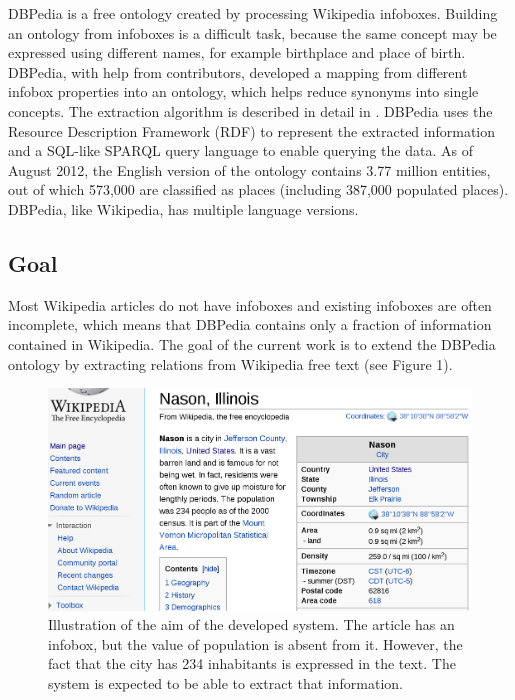 \documentclass[10pt,a5paper,twoside]{article}
\begin{document}
DBPedia is a free ontology created by processing Wikipedia infoboxes. Building an ontology from infoboxes is a difficult task, because the same concept may be expressed using different names, for example birthplace and place of birth. DBPedia, with help from contributors, developed a mapping from different infobox properties into an ontology, which helps reduce synonyms into single concepts. The extraction algorithm is described in detail in \cite{al2007}. DBPedia uses the Resource Description Framework (RDF) to represent the extracted information and a SQL-like SPARQL query language to enable querying the data. As of August 2012, the English version of the ontology contains 3.77 million entities, out of which 573,000 are classified as places (including 387,000 populated places). DBPedia, like Wikipedia, has multiple language versions.

\subsection{Goal}
Most Wikipedia articles do not have infoboxes and existing infoboxes are often incomplete, which means that DBPedia contains only a fraction of information contained in Wikipedia. The goal of the current work is to extend the DBPedia ontology by extracting relations from Wikipedia free text (see Figure 1).

\begin{figure}[htbp] 
\begin{center}
\includegraphics[scale=0.29]{nason.png}
\caption{Illustration of the aim of the developed system. The article has an infobox, but the value of population is absent from it. However, the fact that the city has 234 inhabitants is expressed in the text. The system is expected to be able to extract that information.}
\end{center} 
\end{figure}
\end{document}
